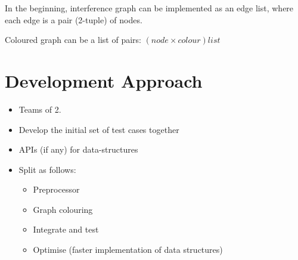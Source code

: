 \documentclass[12pts]{article}
\begin{document}
In the beginning, interference graph can be implemented as an edge list, where each edge is a pair (2-tuple) of nodes.

Coloured graph can be a list of pairs: $(node \times colour) list$

\section*{Development Approach}
\begin{itemize}
\item Teams of 2.
\item Develop the initial set of test cases together
\item APIs (if any) for data-structures
\item Split as follows:
	\begin{itemize}
	\item Preprocessor
	\item Graph colouring
	\item Integrate and test
	\item Optimise (faster implementation of data structures)
	\end{itemize}
\end{itemize}
\end{document}
